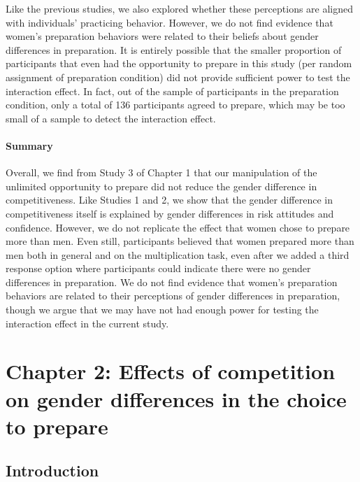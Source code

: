 \documentclass[a4paper, nobind]{templates/ociamthesis}
\begin{document}
Like the previous studies, we also explored whether these perceptions are aligned with individuals' practicing behavior. However, we do not find evidence that women's preparation behaviors were related to their beliefs about gender differences in preparation. It is entirely possible that the smaller proportion of participants that even had the opportunity to prepare in this study (per random assignment of preparation condition) did not provide sufficient power to test the interaction effect. In fact, out of the sample of participants in the preparation condition, only a total of 136 participants agreed to prepare, which may be too small of a sample to detect the interaction effect.

\hypertarget{summary-2}{%
\subsubsection{Summary}\label{summary-2}}

Overall, we find from Study 3 of Chapter 1 that our manipulation of the unlimited opportunity to prepare did not reduce the gender difference in competitiveness. Like Studies 1 and 2, we show that the gender difference in competitiveness itself is explained by gender differences in risk attitudes and confidence. However, we do not replicate the effect that women chose to prepare more than men. Even still, participants believed that women prepared more than men both in general and on the multiplication task, even after we added a third response option where participants could indicate there were no gender differences in preparation. We do not find evidence that women's preparation behaviors are related to their perceptions of gender differences in preparation, though we argue that we may have not had enough power for testing the interaction effect in the current study.

\hypertarget{chapter-2-effects-of-competition-on-gender-differences-in-the-choice-to-prepare}{%
\chapter{Chapter 2: Effects of competition on gender differences in the choice to prepare}\label{chapter-2-effects-of-competition-on-gender-differences-in-the-choice-to-prepare}}

\hypertarget{introduction-2}{%
\section{Introduction}\label{introduction-2}}
\end{document}
